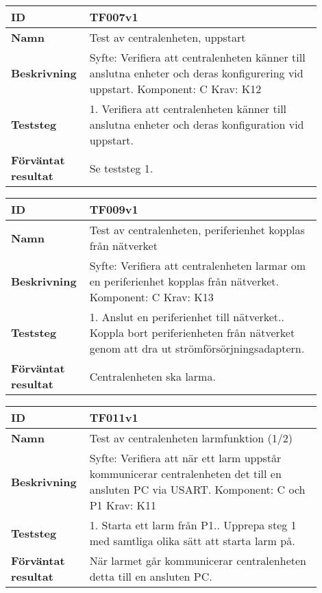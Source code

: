 \begin{table}[h!]
\begin{tabular}{| p{0.18\linewidth} | p{0.72\linewidth} |}
\hline
\textbf{ID} & TF007v1 \\ \hline
\textbf{Namn} & Test av centralenheten, uppstart\\ \hline
\textbf{Beskrivning} &
Syfte: Verifiera att centralenheten känner till anslutna enheter och deras konfigurering vid uppstart. \newline
Komponent: C\newline
Krav: K12
\\ \hline
\textbf{Teststeg} &
1. Verifiera att centralenheten känner till anslutna enheter och deras 
konfiguration vid uppstart.
\\ \hline
\textbf{Förväntat resultat} & Se teststeg 1.
\\ \hline
\end{tabular}
\end{table}

\begin{table}[h!]
\begin{tabular}{| p{0.18\linewidth} | p{0.72\linewidth} |}
\hline
\textbf{ID} & TF009v1 \\ \hline
\textbf{Namn} & Test av centralenheten, periferienhet kopplas från nätverket\\ \hline
\textbf{Beskrivning} &
Syfte: Verifiera att centralenheten larmar om en periferienhet kopplas från nätverket.\newline
Komponent: C\newline
Krav: K13
\\ \hline
\textbf{Teststeg} &
1. Anslut en periferienhet till nätverket.\newline
2. Koppla bort periferienheten från nätverket genom att dra ut 
strömförsörjningsadaptern.
\\ \hline
\textbf{Förväntat resultat} & Centralenheten ska larma.
\\ \hline
\end{tabular}
\end{table}

\newpage

\begin{table}[h!]
\begin{tabular}{| p{0.18\linewidth} | p{0.72\linewidth} |}
\hline
\textbf{ID} & TF011v1 \\ \hline
\textbf{Namn} & Test av centralenheten larmfunktion (1/2)
\\ \hline
\textbf{Beskrivning} &
Syfte: Verifiera att när ett larm uppstår kommunicerar centralenheten det till en ansluten PC via USART.\newline
Komponent: C och P1\newline
Krav: K11
\\ \hline
\textbf{Teststeg} &
1. Starta ett larm från P1.\newline
2. Upprepa steg 1 med samtliga olika sätt att starta larm på.
\\ \hline
\textbf{Förväntat resultat} & När larmet går kommunicerar centralenheten detta till en ansluten PC.
\\ \hline
\end{tabular}
\end{table}

